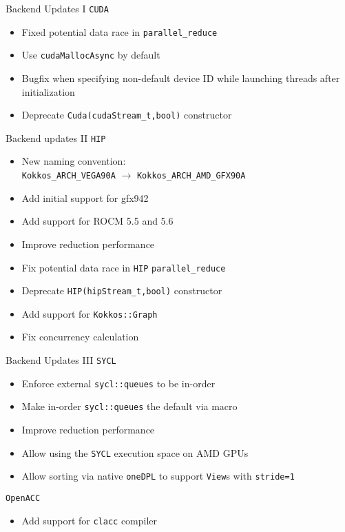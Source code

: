 \begin{frame}[fragile]{Backend Updates I}
\texttt{CUDA}
\begin{itemize}
    \item Fixed potential data race in \texttt{parallel\_reduce}
    \item Use \texttt{cudaMallocAsync} by default
    \item Bugfix when specifying non-default device ID while launching threads after initialization
    \item Deprecate \texttt{Cuda(cudaStream\_t,bool)} constructor
\end{itemize}
\end{frame}
\begin{frame}[fragile]{Backend updates II}
\texttt{HIP}
\begin{itemize}
    \item New naming convention:\\ \texttt{Kokkos\_ARCH\_VEGA90A} $\rightarrow$ \texttt{Kokkos\_ARCH\_AMD\_GFX90A}
    \item Add initial support for gfx942
    \item Add support for ROCM 5.5 and 5.6
    \item Improve reduction performance
    \item Fix potential data race in \texttt{HIP} \texttt{parallel\_reduce}
    \item Deprecate \texttt{HIP(hipStream\_t,bool)} constructor
    \item Add support for \texttt{Kokkos::Graph}
    \item Fix concurrency calculation
\end{itemize}
\end{frame}
\begin{frame}[fragile]{Backend Updates III}
\texttt{SYCL}
\begin{itemize}
    \item Enforce external \texttt{sycl::queues} to be in-order
    \item Make in-order \texttt{sycl::queues} the default via macro
    \item Improve reduction performance
    \item Allow using the \texttt{SYCL} execution space on AMD GPUs
    \item Allow sorting via native \texttt{oneDPL} to support \texttt{View}s with \texttt{stride=1}
\end{itemize}
\vfill
\texttt{OpenACC}
\begin{itemize}
    \item Add support for \texttt{clacc} compiler
\end{itemize}
\end{frame}



